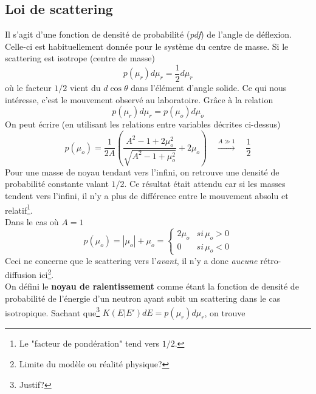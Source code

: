 	\subsection{Loi de scattering}
	Il s'agit d'une fonction de densité de probabilité (\textit{pdf}) de l'angle de déflexion. 
	Celle-ci est habituellement donnée pour le système du centre de masse. Si le scattering 
	est isotrope (centre de masse)
	\begin{equation}
	p({\mu _r})d{\mu _r} = \frac{1}{2}d{\mu _r}
	\end{equation}
	où le facteur $1/2$ vient du $d\cos\theta$ dans l'élément d'angle solide. Ce qui nous intéresse, 
	c'est le mouvement observé au laboratoire. Grâce à la relation
	\begin{equation}
	p({\mu _r})d{\mu _r} = p({\mu _o})d{\mu _o}
	\end{equation}
	On peut écrire (en utilisant les relations entre variables décrites ci-dessus)
	\begin{equation}
	p({\mu _o}) = \frac{1}{{2A}}\left(   \frac{{{A^2} - 1 + 2\mu _o^2}}{{\sqrt {{A^2} - 1 +
	\mu _o^2} }} + 2{\mu _o}  \right) \quad\overset{A \gg 1}{\longrightarrow}\quad \frac{1}{2}
	\end{equation}
	Pour une masse de noyau tendant vers l'infini, on retrouve une densité de probabilité constante
	valant $1/2$. Ce résultat était attendu car si les masses tendent vers l'infini, il n'y a plus 
	de différence entre le mouvement absolu et relatif\footnote{Le "facteur de pondération" tend 
	vers $1/2$.}.\\
	
	Dans le cas où $A=1$
	\begin{equation}
	p({\mu _o}) = |{\mu _o}| + {\mu _o} = \left\{ {\begin{array}{*{20}{c}}
	{2{\mu _o}}&{si\,{\mu _o} > 0}\\
	0&{si\,{\mu _o} < 0}
	\end{array}} \right.
	\end{equation}
	Ceci ne concerne que le scattering vers l'\textit{avant}, il n'y a donc \textit{aucune} 
	rétro-diffusion ici\footnote{Limite du modèle ou réalité physique?}.\\
	
	On défini le \textbf{noyau de ralentissement} comme étant la fonction de densité de probabilité 
	de l'énergie d'un neutron ayant subit un scattering dans le cas isotropique. Sachant 
	que\footnote{Justif?} $K(E|E')dE = p({\mu _r})d{\mu _r}$, on trouve\\
	
